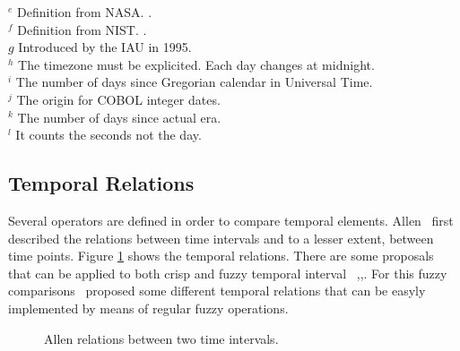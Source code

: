 \begin{table}
$^e$ Definition from NASA. \cite{Sch}. \\
$^f$ Definition from NIST. \cite{Nis}. \\
$g$ Introduced by the IAU in 1995. \\
$^h$ The timezone must be explicited. Each day changes at midnight. \\
$^i$ The number of days since Gregorian calendar in Universal Time. \\
$^j$ The origin for COBOL integer dates. \\
$^k$  The number of days since actual era. \\
$^l$  It counts the seconds not the day. \\
\end{table}


\subsection{Temporal Relations}


Several operators are defined in order to compare temporal elements. Allen~\cite{Allen83} first described the relations between time intervals and to a lesser extent, between time points. Figure \ref{fig:allen} shows the temporal relations. There are some proposals that can be applied to both crisp and fuzzy temporal interval ~\cite{ohlbach2004},\cite{nagypal2003},\cite{schockaert08}. For this fuzzy comparisons~\cite{garrido2009} proposed some different temporal relations that can be easyly implemented by means of regular fuzzy operations.

\begin{figure}
\centering

\caption{Allen relations between two time intervals.}
\label{fig:allen}
\end{figure}

